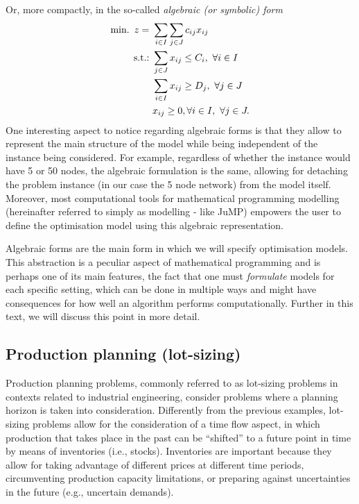 Or, more compactly, in the so-called \emph{algebraic (or symbolic) form}
%
\begin{align*}
	\mathop{\text{min.~}} z = \ &\sum_{i \in I}\sum_{j \in J}c_{ij}x_{ij} \\
	\mathop{\text{s.t.:~}} & \sum_{j \in J} x_{ij} \leq C_i, ~\forall i \in I \\
	& \sum_{i \in I} x_{ij} \geq D_j, ~\forall j \in J \\
	&x_{ij} \geq 0, \forall i \in I, ~\forall j \in J.
\end{align*}
%
One interesting aspect to notice regarding algebraic forms is that they allow to represent the main structure of the model while being independent of the instance being considered. For example, regardless of whether the instance would have 5 or 50 nodes, the algebraic formulation is the same, allowing for detaching the problem instance (in our case the 5 node network) from the model itself. Moreover, most computational tools for mathematical programming modelling (hereinafter referred to simply as modelling - like JuMP) empowers the user to define the optimisation model using this algebraic representation.

Algebraic forms are the main form in which we will specify optimisation models. This abstraction is a peculiar aspect of mathematical programming and is perhaps one of its main features, the fact that one must \emph{formulate} models for each specific setting, which can be done in multiple ways and might have consequences for how well an algorithm performs computationally. Further in this text, we will discuss this point in more detail.  


\subsection{Production planning (lot-sizing)}

Production planning problems, commonly referred to as lot-sizing problems in contexts related to industrial engineering, consider problems where a planning horizon is taken into consideration. Differently from the previous examples, lot-sizing problems allow for the consideration of a time flow aspect, in which production that takes place in the past can be ``shifted'' to a future point in time by means of inventories (i.e., stocks). Inventories are important because they allow for taking advantage of different prices at different time periods, circumventing production capacity limitations, or preparing against uncertainties in the future (e.g., uncertain demands).

